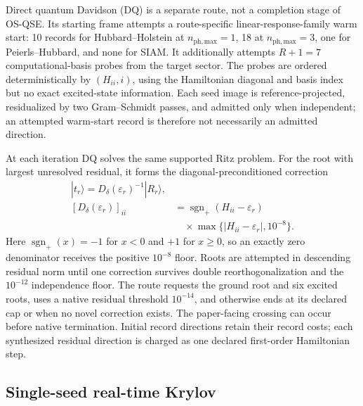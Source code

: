 \documentclass[
  reprint,
  amsmath,
  amssymb,
  aps,
  pra,
  nofootinbib,
  superscriptaddress,
  floatfix
]{revtex4-2}
\newcommand{\ket}[1]{|#1\rangle}
\newcommand{\phmax}{n_{\mathrm{ph,max}}}
\begin{document}
Direct quantum Davidson (DQ) is a separate route, not a completion stage of
OS-QSE.  Its starting frame attempts a route-specific linear-response-family
warm start: 10 records for Hubbard--Holstein at $\phmax=1$, 18 at
$\phmax=3$, one for Peierls--Hubbard, and none for SIAM.  It additionally
attempts $R+1=7$ computational-basis probes from the target sector.  The
probes are ordered deterministically by $(H_{ii},i)$, using the Hamiltonian
diagonal and basis index but no exact excited-state information.  Each seed
image is reference-projected, residualized by two Gram--Schmidt passes, and
admitted only when independent; an attempted warm-start record is therefore
not necessarily an admitted direction.

At each iteration DQ solves the same supported Ritz problem.  For the root
with largest unresolved residual, it forms the diagonal-preconditioned
correction
\begin{align}
 \ket{t_r}=D_\delta(\varepsilon_r)^{-1}\ket{R_r},
 \nonumber\\
 [D_\delta(\varepsilon_r)]_{ii}
 &=\operatorname{sgn}_{+}(H_{ii}-\varepsilon_r)
 \nonumber\\[-0.5ex]
 &\quad\times\max\{|H_{ii}-\varepsilon_r|,10^{-8}\}.
 \label{eq:davidson_correction}
\end{align}
Here $\operatorname{sgn}_{+}(x)=-1$ for $x<0$ and $+1$ for $x\geq0$,
so an exactly zero denominator receives the positive $10^{-8}$ floor.
Roots are attempted in descending residual norm until one correction survives
double reorthogonalization and the $10^{-12}$ independence floor.  The route
requests the ground root and six excited roots, uses a native residual
threshold $10^{-14}$, and otherwise ends at its declared cap or when no novel
correction exists.  The paper-facing crossing can occur before native
termination.  Initial record directions retain their record costs; each
synthesized residual direction is charged as one declared first-order
Hamiltonian step.

\subsection{Single-seed real-time Krylov}
\label{sec:single_rtk}
\end{document}

